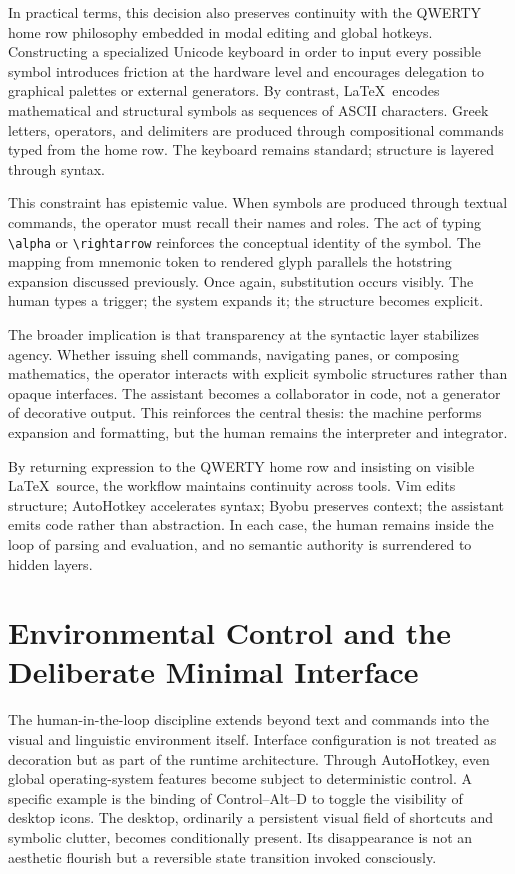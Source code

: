 \documentclass[11pt]{article}
\begin{document}
In practical terms, this decision also preserves continuity with the QWERTY home row philosophy embedded in modal editing and global hotkeys. Constructing a specialized Unicode keyboard in order to input every possible symbol introduces friction at the hardware level and encourages delegation to graphical palettes or external generators. By contrast, \LaTeX\ encodes mathematical and structural symbols as sequences of ASCII characters. Greek letters, operators, and delimiters are produced through compositional commands typed from the home row. The keyboard remains standard; structure is layered through syntax.

This constraint has epistemic value. When symbols are produced through textual commands, the operator must recall their names and roles. The act of typing \verb|\alpha| or \verb|\rightarrow| reinforces the conceptual identity of the symbol. The mapping from mnemonic token to rendered glyph parallels the hotstring expansion discussed previously. Once again, substitution occurs visibly. The human types a trigger; the system expands it; the structure becomes explicit.

The broader implication is that transparency at the syntactic layer stabilizes agency. Whether issuing shell commands, navigating panes, or composing mathematics, the operator interacts with explicit symbolic structures rather than opaque interfaces. The assistant becomes a collaborator in code, not a generator of decorative output. This reinforces the central thesis: the machine performs expansion and formatting, but the human remains the interpreter and integrator.

By returning expression to the QWERTY home row and insisting on visible \LaTeX\ source, the workflow maintains continuity across tools. Vim edits structure; AutoHotkey accelerates syntax; Byobu preserves context; the assistant emits code rather than abstraction. In each case, the human remains inside the loop of parsing and evaluation, and no semantic authority is surrendered to hidden layers.

\section{Environmental Control and the Deliberate Minimal Interface}

The human-in-the-loop discipline extends beyond text and commands into the visual and linguistic environment itself. Interface configuration is not treated as decoration but as part of the runtime architecture. Through AutoHotkey, even global operating-system features become subject to deterministic control. A specific example is the binding of Control–Alt–D to toggle the visibility of desktop icons. The desktop, ordinarily a persistent visual field of shortcuts and symbolic clutter, becomes conditionally present. Its disappearance is not an aesthetic flourish but a reversible state transition invoked consciously.
\end{document}
